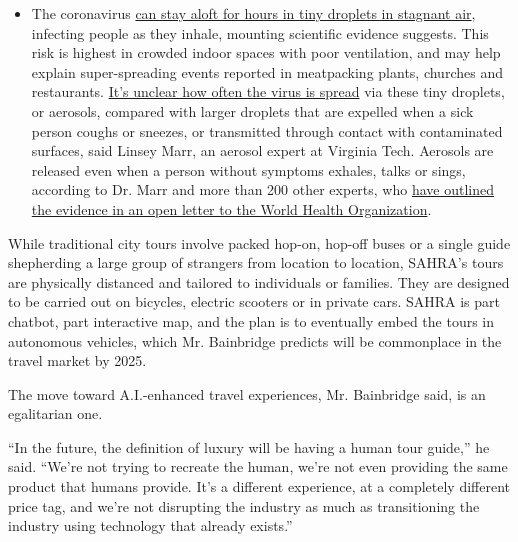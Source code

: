 \begin{itemize}
  \begin{itemize}
  \tightlist
  \item
    The coronavirus
    \href{https://www.nytimes.com/2020/07/04/health/239-experts-with-one-big-claim-the-coronavirus-is-airborne.html?action=click\&pgtype=Article\&state=default\&region=MAIN_CONTENT_3\&context=storylines_faq}{can
    stay aloft for hours in tiny droplets in stagnant air}, infecting
    people as they inhale, mounting scientific evidence suggests. This
    risk is highest in crowded indoor spaces with poor ventilation, and
    may help explain super-spreading events reported in meatpacking
    plants, churches and restaurants.
    \href{https://www.nytimes.com/2020/07/06/health/coronavirus-airborne-aerosols.html?action=click\&pgtype=Article\&state=default\&region=MAIN_CONTENT_3\&context=storylines_faq}{It's
    unclear how often the virus is spread} via these tiny droplets, or
    aerosols, compared with larger droplets that are expelled when a
    sick person coughs or sneezes, or transmitted through contact with
    contaminated surfaces, said Linsey Marr, an aerosol expert at
    Virginia Tech. Aerosols are released even when a person without
    symptoms exhales, talks or sings, according to Dr. Marr and more
    than 200 other experts, who
    \href{https://academic.oup.com/cid/article/doi/10.1093/cid/ciaa939/5867798}{have
    outlined the evidence in an open letter to the World Health
    Organization}.
  \end{itemize}
\end{itemize}

While traditional city tours involve packed hop-on, hop-off buses or a
single guide shepherding a large group of strangers from location to
location, SAHRA's tours are physically distanced and tailored to
individuals or families. They are designed to be carried out on
bicycles, electric scooters or in private cars. SAHRA is part chatbot,
part interactive map, and the plan is to eventually embed the tours in
autonomous vehicles, which Mr. Bainbridge predicts will be commonplace
in the travel market by 2025.

The move toward A.I.-enhanced travel experiences, Mr. Bainbridge said,
is an egalitarian one.

``In the future, the definition of luxury will be having a human tour
guide,'' he said. ``We're not trying to recreate the human, we're not
even providing the same product that humans provide. It's a different
experience, at a completely different price tag, and we're not
disrupting the industry as much as transitioning the industry using
technology that already exists.''


